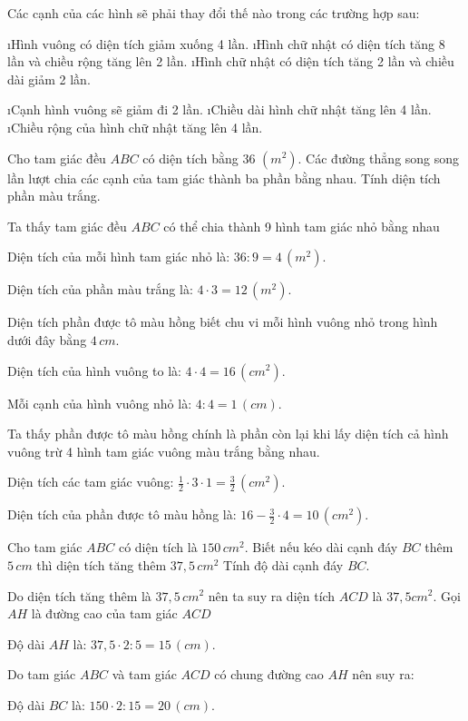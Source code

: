 \begin{bt}
	Các cạnh của các hình sẽ phải thay đổi thế nào trong các trường hợp sau:
	\begin{enumerate}[a), leftmargin=*]
		\i Hình vuông có diện tích giảm xuống 4 lần.
		\i Hình chữ nhật có diện tích tăng 8 lần và chiều rộng tăng lên 2 lần.
		\i Hình chữ nhật có diện tích tăng 2 lần và chiều dài giảm 2 lần.
	\end{enumerate}
	\begin{loigiaichuong37}
		\begin{enumerate}[a), leftmargin=*]
			\i Cạnh hình vuông sẽ giảm đi 2 lần.
			\i Chiều dài hình chữ nhật tăng lên 4 lần.
			\i Chiều rộng của hình chữ nhật tăng lên 4 lần.
		\end{enumerate}
	\end{loigiaichuong37}
\end{bt}
\begin{bt}
	Cho tam giác đều $ABC$  có diện tích bằng 36 $({{m}^{2}}).$  Các đường thẳng song song lần lượt chia các cạnh của tam giác thành ba phần bằng nhau. Tính diện tích phần màu trắng.
	\begin{loigiaichuong37}
		Ta thấy tam giác đều $ABC$ có thể chia thành 9 hình tam giác nhỏ bằng nhau 
		
		Diện tích của mỗi hình tam giác nhỏ là:  $36:9=4\,(m^2).$ 
		
		Diện tích của phần màu trắng là:  $4\cdot3=12\,(m^2).$ 
	\end{loigiaichuong37}
\end{bt} 
\begin{bt}
	Diện tích phần được tô màu hồng biết chu vi mỗi hình vuông nhỏ trong hình dưới đây bằng  $4\,cm.$ 
	\begin{loigiaichuong37}
		Diện tích của hình vuông to là:  $4\cdot4=16 \,(cm^2).$ 
		
		Mỗi cạnh của hình vuông nhỏ là:  $4:4=1\,(cm).$
		 
		Ta thấy phần được tô màu hồng chính là phần còn lại khi lấy diện tích cả hình vuông trừ 4 hình tam giác vuông màu trắng bằng nhau.
		
		Diện tích các tam giác vuông:  $\frac{1}{2}\cdot3\cdot1=\frac{3}{2}\, (cm^2).$
		 
		Diện tích của phần được tô màu hồng là:  $16-\frac{3}{2}\cdot4=10\, (cm^2).$ 
	\end{loigiaichuong37}
\end{bt}
\begin{bt}
	Cho tam giác $ABC$ có diện tích là  $150\, cm^2$. Biết nếu kéo dài cạnh đáy $BC$ thêm $5 \,cm$  thì diện tích tăng thêm $37,5\, cm^2$ Tính độ dài cạnh đáy $BC$. 
	\begin{loigiaichuong37}
		Do diện tích tăng thêm là  $37,5 \,cm^2$ nên ta suy ra diện tích $ACD$ là  $37,5 cm^2$. Gọi $AH$ là đường cao của tam giác $ACD$
		
		Độ dài $AH$ là:  $37,5\cdot2:5=15\,(cm).$
		 
		Do tam giác $ABC$ và tam giác $ACD$ có chung đường cao $AH$ nên suy ra:
		
		Độ dài $BC$ là:  $150\cdot2:15=20 \,(cm).$ 
	\end{loigiaichuong37}
\end{bt}
